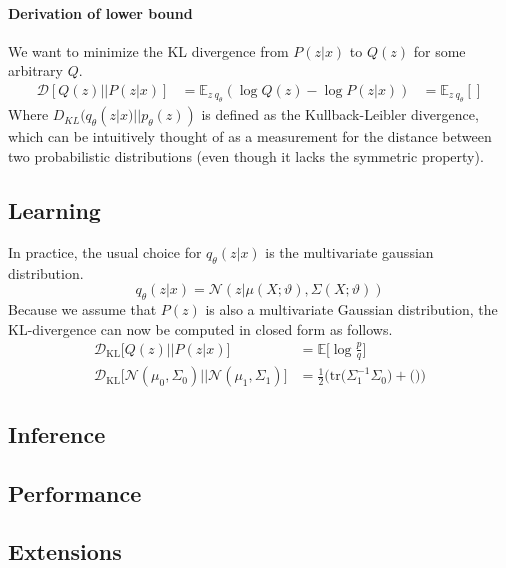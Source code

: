 \documentclass[twoside,11pt,a4paper]{article}
\theoremstyle{break}
\begin{document}
\paragraph{Derivation of lower bound}
We want to minimize the KL divergence from $P(z|x)$ to $Q(z)$ for some arbitrary $Q$.
  \begin{align*}
    \label{eq:der_lower_bound}
    \mathcal{D}[Q(z)||P(z|x)] &= \mathbb{E}_{z~q_\theta}(\log Q(z) - \log P(z|x))
    &= \mathbb{E}_{z ~ q_\theta}[]
  \end{align*}
Where $D_{KL}(q_\theta(z|x) || p_\theta(z))$ is defined as the Kullback-Leibler divergence, which can be intuitively thought of as a measurement for the distance between two probabilistic distributions (even though it lacks the symmetric property).





\subsection{Learning}
\label{sub:vae_learning}
In practice, the usual choice for $q_\theta(z|x)$ is the multivariate gaussian distribution.
$$
q_\theta(z|x) = \mathcal{N}(z|\mu(X;\vartheta), \Sigma(X;\vartheta))
$$
Because we assume that $P(z)$ is also a multivariate Gaussian distribution, the KL-divergence can now be computed in closed form as follows\cite{derivations:2007}.
\begin{align*}
  \mathcal{D}_{\mathrm{KL}}\big[Q(z) || P(z|x)\big] &= \mathbb{E}\big[\log \frac{p}{q}\big]\\
  \mathcal{D}_{\mathrm{KL}}\big[\mathcal{N}(\mu_0,\Sigma_0) || \mathcal{N}(\mu_1,\Sigma_1)\big]
  &= \frac{1}{2} \big(\mathrm{tr}\big(\Sigma_1^{-1}\Sigma_0\big) + \big(\big)\big)
\end{align*}


\subsection{Inference}
\label{sub:vae_inference}

\subsection{Performance}
\label{sub:vae_performance}

\subsection{Extensions}
\label{sub:vae_extensions}
\end{document}

